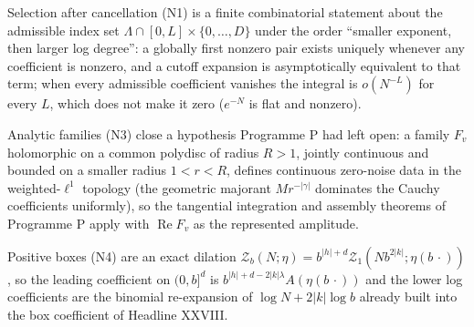 \documentclass[11pt]{article}
\begin{document}
Selection after cancellation (N1) is a finite combinatorial statement about the admissible index set
$\Lambda\cap[0,L]\times\{0,\dots,D\}$ under the order ``smaller exponent, then larger log degree'':
a globally first nonzero pair exists uniquely whenever any coefficient is nonzero, and a cutoff
expansion is asymptotically equivalent to that term; when every admissible coefficient vanishes the
integral is $o(N^{-L})$ for every $L$, which does not make it zero ($e^{-N}$ is flat and nonzero).

Analytic families (N3) close a hypothesis Programme P had left open: a family $F_v$ holomorphic on a
common polydisc of radius $R>1$, jointly continuous and bounded on a smaller radius $1<r<R$,
defines continuous zero-noise data in the weighted-$\ell^1$ topology (the geometric majorant
$Mr^{-|\gamma|}$ dominates the Cauchy coefficients uniformly), so the tangential integration and
assembly theorems of Programme P apply with $\operatorname{Re}F_v$ as the represented amplitude.

Positive boxes (N4) are an exact dilation $\mathcal Z_b(N;\eta)=b^{|h|+d}\mathcal Z_1(Nb^{2|k|};\eta(b\,\cdot))$,
so the leading coefficient on $(0,b]^d$ is $b^{|h|+d-2|k|\lambda}A(\eta(b\,\cdot))$ and the lower
log coefficients are the binomial re-expansion of $\log N+2|k|\log b$ already built into the box
coefficient of Headline XXVIII.
\end{document}
